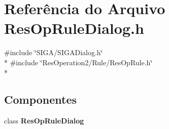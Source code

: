 \section{Referência do Arquivo Res\+Op\+Rule\+Dialog.\+h}
\label{_2_rule_2_res_op_rule_dialog_8h}
{\ttfamily \#include \char`\"{}S\+I\+G\+A/\+S\+I\+G\+A\+Dialog.\+h\char`\"{}}\\*
{\ttfamily \#include \char`\"{}Res\+Operation2/\+Rule/\+Res\+Op\+Rule.\+h\char`\"{}}\\*
\subsection*{Componentes}
\begin{DoxyCompactItemize}
\item 
class {\bf Res\+Op\+Rule\+Dialog}
\end{DoxyCompactItemize}
